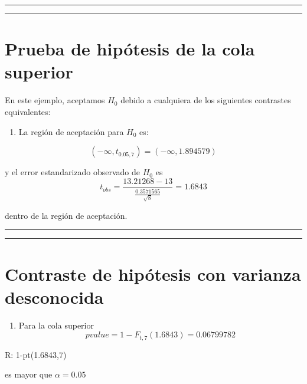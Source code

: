 \documentclass[
]{book}
\providecommand{\tightlist}{%
  \setlength{\itemsep}{0pt}\setlength{\parskip}{0pt}}
\begin{document}
\begin{center}\rule{0.5\linewidth}{0.5pt}\end{center}

\begin{center}\rule{0.5\linewidth}{0.5pt}\end{center}

\hypertarget{prueba-de-hipuxf3tesis-de-la-cola-superior}{%
\section{Prueba de hipótesis de la cola superior}\label{prueba-de-hipuxf3tesis-de-la-cola-superior}}

En este ejemplo, aceptamos \(H_0\) debido a cualquiera de los siguientes contrastes equivalentes:

\begin{enumerate}
\def\labelenumi{\arabic{enumi}.}
\tightlist
\item
  La región de aceptación para \(H_0\) es:
\end{enumerate}

\[(-\infty, t_{0.05,7})=( -\infty, 1.894579)\]

y el error estandarizado observado de \(H_0\) es
\[t_{obs} = \frac{13.21268-13}{\frac{0.3571565}{\sqrt{8}}}=1.6843\]

dentro de la región de aceptación.

\begin{center}\rule{0.5\linewidth}{0.5pt}\end{center}

\begin{center}\rule{0.5\linewidth}{0.5pt}\end{center}

\hypertarget{contraste-de-hipuxf3tesis-con-varianza-desconocida-2}{%
\section{Contraste de hipótesis con varianza desconocida}\label{contraste-de-hipuxf3tesis-con-varianza-desconocida-2}}

\begin{enumerate}
\def\labelenumi{\arabic{enumi}.}
\setcounter{enumi}{1}
\tightlist
\item
  Para la cola superior \[pvalue=1-F_{t,7}(1.6843)=0.06799782\]
\end{enumerate}

R: 1-pt(1.6843,7)

es mayor que \(\alpha=0.05\)
\end{document}
